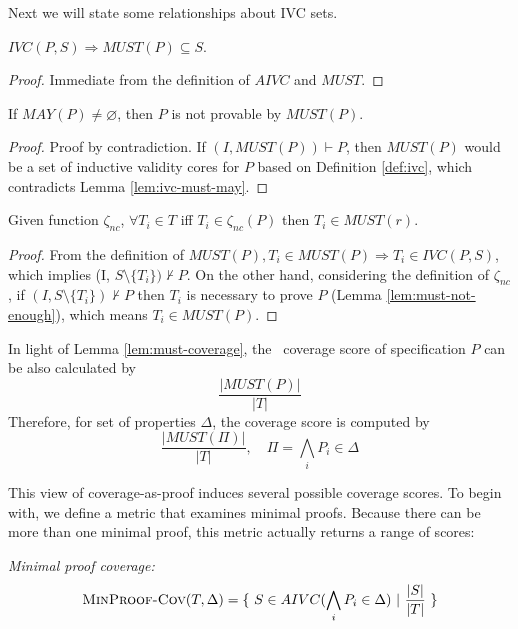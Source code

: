 Next we will state some relationships about IVC sets.

\begin{lemma}
  \label{lem:ivc-must-may}
 $IVC(P, S) \Rightarrow  MUST(P) \subseteq S$.
\end{lemma}
\begin{proof}
 Immediate from the definition of $AIVC$ and $MUST$.
\end{proof}
\vspace{2mm}

\begin{lemma}
  \label{lem:must-not-enough}
  If $MAY(P) \neq \varnothing$, then $P$ is not provable by $MUST(P)$.
\end{lemma}
\begin{proof}
  Proof by contradiction. If $(I, MUST(P)) \vdash P$, then $MUST(P)$
  would be a set of inductive validity cores for $P$ based on Definition \ref{def:ivc},
  which contradicts Lemma \ref{lem:ivc-must-may}.
\end{proof}
\vspace{2mm}

\begin{lemma}
  \label{lem:must-coverage} 
  Given function $\zeta_{nc}$, $\forall T_i \in T$ iff
  $T_i \in \zeta_{nc}(P)$ then $T_i \in MUST(r)$.
\end{lemma}
\begin{proof}
 From the definition of $MUST(P), T_i \in MUST (P) \Rightarrow T_i \in IVC(P, S)$,
 which implies (I, $S \setminus \{ T_i \}) \nvdash P$.
 On the other hand, considering the definition of $\zeta_{nc}$, if
 $(I, S \setminus \{ T_i \}) \nvdash P$ then $T_i$ is necessary to prove $P$ (Lemma \ref{lem:must-not-enough}), which means $T_i \in MUST(P)$.
\end{proof}
\vspace{2mm}

In light of Lemma \ref{lem:must-coverage}, the \nondetcov\ coverage score of specification $P$ can be also calculated by
$$\frac{|MUST(P)|}{|T|}$$
Therefore, for set of properties $\Delta$, the coverage score is computed by $$\frac{|MUST(\Pi)|}{|T|},\quad  \Pi= \bigwedge_{i} {P_i \in \Delta}$$
\vspace{0.2in}

This view of coverage-as-proof induces several possible coverage scores.  To begin with, we define a metric that examines minimal proofs.  Because
there can be more than one minimal proof, this metric actually returns a range of scores:
\begin{definition} {\emph{Minimal proof coverage:}} \\
  \label{def:coverage-ivc}
\[
   \text{\sc MinProof-Cov}(T, \Delta) = \{~S \in AIVC(\bigwedge_{i} {P_i \in \Delta})~|~\frac{ |S|}{|T|}~\}
\]
\end{definition}

